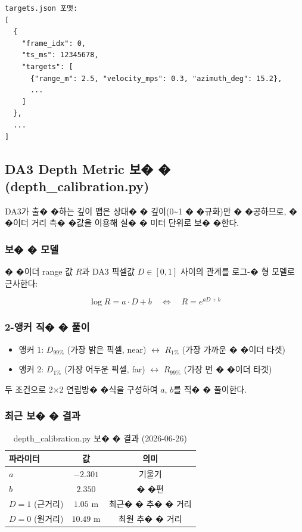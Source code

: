 \documentclass[a4paper,12pt]{article}
\begin{document}
\begin{lstlisting}[style=plain]
targets.json 포맷:
[
  {
    "frame_idx": 0,
    "ts_ms": 12345678,
    "targets": [
      {"range_m": 2.5, "velocity_mps": 0.3, "azimuth_deg": 15.2},
      ...
    ]
  },
  ...
]
\end{lstlisting}

\subsection{DA3 Depth Metric 보� � (depth\_calibration.py)}

DA3가 출� �하는 깊이 맵은 상대� � 깊이(0\textasciitilde1 � �규화)만 � �공하므로,
� �이더 거리 측� �값을 이용해 실� � 미터 단위로 보� �한다.

\subsubsection{보� � 모델}

� �이더 range 값 $R$과 DA3 픽셀값 $D \in [0,1]$ 사이의 관계를
로그-� 형 모델로 근사한다:

\begin{equation}
  \log R = a \cdot D + b \quad \Longleftrightarrow \quad R = e^{aD + b}
\end{equation}

\subsubsection{2-앵커 직� � 풀이}

\begin{itemize}[leftmargin=2em]
  \item 앵커 1: $D_{99\%}$ (가장 밝은 픽셀, near) $\leftrightarrow$ $R_{1\%}$ (가장 가까운 � �이더 타겟)
  \item 앵커 2: $D_{1\%}$ (가장 어두운 픽셀, far) $\leftrightarrow$ $R_{99\%}$ (가장 먼 � �이더 타겟)
\end{itemize}

두 조건으로 2×2 연립방� �식을 구성하여 $a$, $b$를 직� � 풀이한다.

\subsubsection{최근 보� � 결과}

\begin{table}[h]
\centering
\begin{tabular}{lcc}
  \toprule
  \textbf{파라미터} & \textbf{값} & \textbf{의미} \\
  \midrule
  $a$ & $-2.301$ & 기울기 \\
  $b$ & $2.350$ & � �편 \\
  $D=1$ (근거리) & $1.05$ m & 최근� � 추� � 거리 \\
  $D=0$ (원거리) & $10.49$ m & 최원 추� � 거리 \\
  \bottomrule
\end{tabular}
\caption{depth\_calibration.py 보� � 결과 (2026-06-26)}
\end{table}
\end{document}
